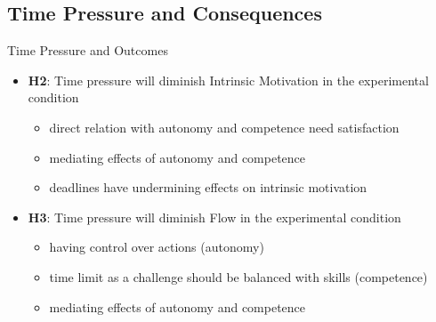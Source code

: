 \documentclass{beamer}
\begin{document}
\subsection{Time Pressure and Consequences}
\begin{frame}{Time Pressure and Outcomes}
\begin{itemize}
	\item \textbf{H2}: \alert{Time pressure will diminish Intrinsic Motivation} in the  experimental condition
		\begin{itemize}
			\item direct relation with autonomy and competence need satisfaction \cite{PrzybylskiRigbyRyan2006MotivationPullofGames}
			\item mediating effects of autonomy and competence \cite{PrzybylskiRigbyRyan2006MotivationPullofGames, Tamborini2010definemedia,Schmierbach2014DifficultyMotivation}
			\item deadlines have undermining effects on intrinsic motivation \cite{amabile1976timePressure, Sheldon2008Manipulating, Deci2000GoalPursuit}
		\end{itemize}
  \item \textbf{H3}: \alert{Time pressure will diminish Flow} in the  experimental condition
  \begin{itemize}
  		\item having control over actions (autonomy)
		\item time limit as a challenge should be balanced with skills (competence) \cite{romero2013time, Tavassolian2011TimeBalancing}
		\item mediating effects of autonomy and competence
	\end{itemize}
   \end{itemize}
\end{frame}
\end{document}
